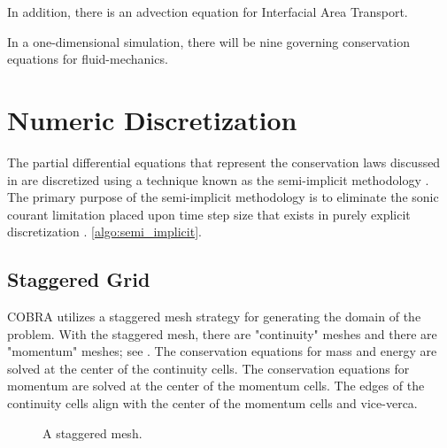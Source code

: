 In addition, there is an advection equation for Interfacial Area Transport.

In a one-dimensional simulation, there will be nine governing conservation equations for fluid-mechanics.




\section{Numeric Discretization}
\label{sect:numeric_methods}

The partial differential equations that represent the conservation laws discussed in  are discretized using a technique known as the semi-implicit methodology \cite{Liles1978}.
The primary purpose of the semi-implicit methodology is to eliminate the sonic courant limitation placed upon time step size that exists in purely explicit discretization \cite{someone}. \ref{algo:semi_implicit}.

\subsection{Staggered Grid}
\label{subsect:topology}

COBRA utilizes a staggered mesh strategy for generating the domain of the problem. 
With the staggered mesh, there are "continuity" meshes and there are "momentum" meshes; see .
The conservation equations for mass and energy are solved at the center of the continuity cells.
The conservation equations for momentum are solved at the center of the momentum cells.
The edges of the continuity cells align with the center of the momentum cells and vice-verca.

\begin{figure}[ht]
\caption{A staggered mesh.}
\label{fig:staggered_mesh}
\begin{center}
\end{center}
\end{figure}


